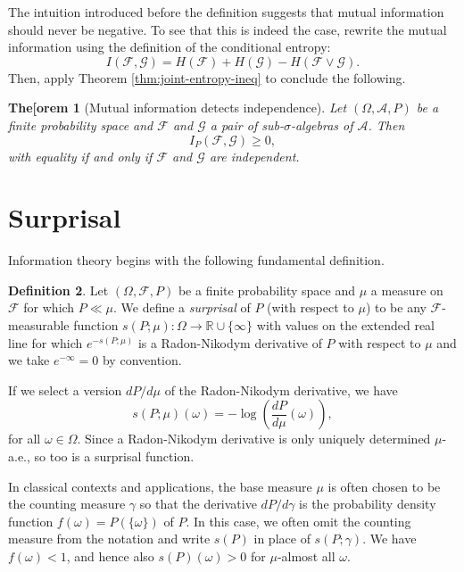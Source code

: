 \documentclass[11pt]{book}
\newtheorem{thm}{The[orem}[section]
\theoremstyle{definition}
\newtheorem{defn}[thm]{Definition}
\numberwithin{equation}{section}
\begin{document}
The intuition introduced before the definition suggests that mutual information should never be negative. To see that this is indeed the case, rewrite the mutual information using the definition of the conditional entropy:
\[
	I(\mathcal{F},\mathcal{G}) = H(\mathcal{F}) + H(\mathcal{G}) - H(\mathcal{F} \vee \mathcal{G}).
\]
Then, apply Theorem \ref{thm:joint-entropy-ineq} to conclude the following.

\begin{thm}[Mutual information detects independence]\label{thm:mutual-info-ineq}
	Let $(\Omega,\mathcal{A},P)$ be a finite probability space and $\mathcal{F}$ and $\mathcal{G}$ a pair of sub-$\sigma$-algebras of $\mathcal{A}$. Then
	\[
		I_P(\mathcal{F}, \mathcal{G}) \geq 0,
	\]
	with equality if and only if $\mathcal{F}$ and $\mathcal{G}$ are independent.
\end{thm}



\section{Surprisal}

Information theory begins with the following fundamental definition.

\begin{defn}
	Let $(\Omega,\mathcal{F},P)$ be a finite probability space and $\mu$ a measure on $\mathcal{F}$ for which $P \ll \mu$. We define a \textit{surprisal} of $P$ (with respect to $\mu$) to be any $\mathcal{F}$-measurable function $s(P;\mu): \Omega \to \mathbb{R} \cup \{\infty\}$ with values on the extended real line for which $e^{-s(P;\mu)}$ is a Radon-Nikodym derivative of $P$ with respect to $\mu$ and we take $e^{-\infty} = 0$ by convention.
\end{defn}

If we select a version $dP/d\mu$ of the Radon-Nikodym derivative, we have
\[s(P;\mu)(\omega) = -\log{ \left( \frac{dP}{d\mu}(\omega) \right)},
\]
for all $\omega \in \Omega$. Since a Radon-Nikodym derivative is only uniquely determined $\mu$-a.e., so too is a surprisal function.

In classical contexts and applications, the base measure $\mu$ is often chosen to be the counting measure $\gamma$ so that the derivative $dP/d\gamma$ is the probability density function $f(\omega) = P(\{\omega\})$ of $P$. In this case, we often omit the counting measure from the notation and write $s(P)$ in place of $s(P;\gamma)$. We have $f(\omega) < 1$, and hence also $s(P)(\omega) > 0$ for $\mu$-almost all $\omega$.
\end{document}
